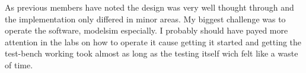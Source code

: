 As previous members have noted the design was very well thought
through and the implementation only differed in minor areas. My
biggest challenge was to operate the software, modelsim especially. I
probably should have payed more attention in the labs on how to
operate it cause getting it started and getting the test-bench working
took almost as long as the testing itself wich felt like a waste of time.
